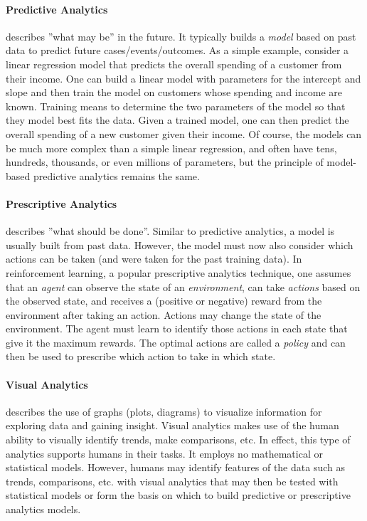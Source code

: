 \paragraph*{Predictive Analytics} describes ''what may be'' in the future. It typically builds a \emph{model} based on past data to predict future cases/events/outcomes. As a simple example, consider a linear regression model that predicts the overall spending of a customer from their income. One can build a linear model with parameters for the intercept and slope and then train the model on customers whose spending and income are known. Training means to determine the two parameters of the model so that they model best fits the data. Given a trained model, one can then predict the overall spending of a new customer given their income. Of course, the models can be much more complex than a simple linear regression, and often have tens, hundreds, thousands, or even millions of parameters, but the principle of model-based predictive analytics remains the same.

\paragraph*{Prescriptive Analytics} describes ''what should be done''. Similar to predictive analytics, a model is usually built from  past data. However, the model must now also consider which actions can be taken (and were taken for the past training data). In reinforcement learning, a popular prescriptive analytics technique, one assumes that an \emph{agent} can observe the state of an \emph{environment}, can take \emph{actions} based on the observed state, and receives a (positive or negative) reward from the environment after taking an action. Actions may change the state of the environment. The agent must learn to identify those actions in each state that give it the maximum rewards. The optimal actions are called a \emph{policy} and can then be used to prescribe which action to take in which state.

\paragraph*{Visual Analytics} describes the use of graphs (plots, diagrams) to visualize information for exploring data and gaining insight. Visual analytics makes use of the human ability to visually identify trends, make comparisons, etc. In effect, this type of analytics supports humans in their tasks. It employs no mathematical or statistical models. However, humans may identify features of the data such as trends, comparisons, etc. with visual analytics that may then be tested with statistical models or form the basis on which to build predictive or prescriptive analytics models. 

